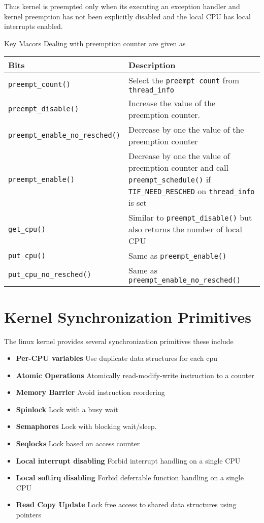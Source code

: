 \documentclass{article}
\begin{document}
Thus kernel is preempted only when its executing an exception handler
and kernel preemption has not been explicitly disabled and the local
CPU has local interrupts enabled.

Key Macors Dealing with preemption counter are given as 

\begin{center}
  \begin{tabular}{ l | p{9 cm} }    
    \hline
    Bits & Description                    \\ \hline
    \lstinline{preempt_count()} & Select the \lstinline{preempt count} from \lstinline{thread_info}    \\ 
    \lstinline{preempt_disable()} & Increase the value of the preemption counter.     \\ 
    \lstinline{preempt_enable_no_resched()} &  Decrease by one the value of the preemption counter  \\
    \lstinline{preempt_enable()} & Decrease by one the value of preemption counter and call \lstinline{preempt_schedule()} if \lstinline{TIF_NEED_RESCHED} on \lstinline{thread_info} is set \\
    \lstinline{get_cpu()} & Similar to \lstinline{preempt_disable()} but also returns the number of local CPU \\
    \lstinline{put_cpu()} & Same as  \lstinline{preempt_enable()} \\
    \lstinline{put_cpu_no_resched()} & Same as \lstinline{preempt_enable_no_resched()}    \\
    \hline
  \end{tabular}
\end{center}


\section{Kernel Synchronization Primitives}

The linux kernel provides several synchronization primitives these
include

\begin{itemize}
\item \textbf{Per-CPU variables}
  Use duplicate data structures for each cpu
\item \textbf{Atomic Operations}
  Atomically read-modify-write instruction to a counter
\item \textbf{Memory Barrier}
  Avoid instruction reordering
\item  \textbf{Spinlock}
  Lock with a busy wait
\item \textbf{Semaphores}
  Lock with blocking wait/sleep.
\item \textbf{Seqlocks}
  Lock based on access counter
\item \textbf{Local interrupt disabling}
  Forbid interrupt handling on a single CPU
\item \textbf{Local softirq disabling}
  Forbid deferrable function handling on a single CPU
\item \textbf{Read Copy Update}
  Lock free access to shared data structures using pointers
\end{itemize}
\end{document}
